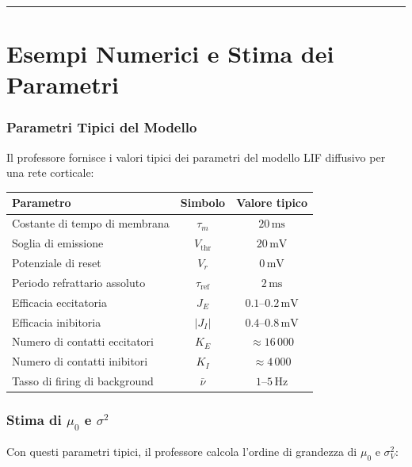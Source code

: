 \vspace{0.5cm}
\noindent\rule{\textwidth}{0.4pt}
\vspace{0.5cm}

\section{Esempi Numerici e Stima dei Parametri}

\subsubsection{Parametri Tipici del Modello}

Il professore fornisce i valori tipici dei parametri del modello LIF diffusivo per una rete corticale:

\begin{table}[htbp]
    \centering
    \renewcommand{\arraystretch}{1.3}
    \begin{tabularx}{\textwidth}{|X|c|c|}
    \hline
    \textbf{Parametro} & \textbf{Simbolo} & \textbf{Valore tipico} \\
    \hline
    Costante di tempo di membrana & $\tau_m$ & $20\,\text{ms}$ \\
    \hline
    Soglia di emissione & $V_{\text{thr}}$ & $20\,\text{mV}$ \\
    \hline
    Potenziale di reset & $V_r$ & $0\,\text{mV}$ \\
    \hline
    Periodo refrattario assoluto & $\tau_{\text{ref}}$ & $2\,\text{ms}$ \\
    \hline
    Efficacia eccitatoria & $J_E$ & $0.1$–$0.2\,\text{mV}$ \\
    \hline
    Efficacia inibitoria & $|J_I|$ & $0.4$–$0.8\,\text{mV}$ \\
    \hline
    Numero di contatti eccitatori & $K_E$ & $\approx 16\,000$ \\
    \hline
    Numero di contatti inibitori & $K_I$ & $\approx 4\,000$ \\
    \hline
    Tasso di firing di background & $\bar{\nu}$ & $1$–$5\,\text{Hz}$ \\
    \hline
    \end{tabularx}
\end{table}

\subsubsection{Stima di $\mu_0$ e $\sigma^2$}

Con questi parametri tipici, il professore calcola l'ordine di grandezza di $\mu_0$ e $\sigma_V^2$:

